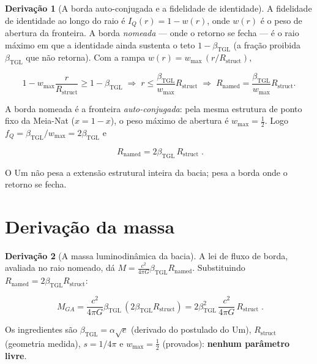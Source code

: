 \documentclass[11pt]{article}
\newcommand{\bTGL}{\beta_{\mathrm{TGL}}}\newcommand{\Msun}{M_{\odot}}\newcommand{\TGL}{\mathrm{TGL}}
\theoremstyle{definition}\newtheorem{deriv}{Derivação}
\begin{document}
\begin{deriv}[A borda auto-conjugada e a fidelidade de identidade]

A fidelidade de identidade ao longo do raio é $I_Q(r)=1-w(r)$, onde $w(r)$ é o peso de abertura da fronteira. A borda \emph{nomeada} --- onde o retorno se fecha --- é o raio máximo em que a identidade ainda sustenta o teto $1-\bTGL$ (a fração proibida $\bTGL$ que não retorna). Com a rampa $w(r)=w_{\max}\,(r/R_{\mathrm{struct}})$,

\begin{equation}1-w_{\max}\frac{r}{R_{\mathrm{struct}}}\geq 1-\bTGL\;\Longrightarrow\;r\leq\frac{\bTGL}{w_{\max}}R_{\mathrm{struct}}\;\Longrightarrow\;R_{\mathrm{named}}=\frac{\bTGL}{w_{\max}}R_{\mathrm{struct}}.\end{equation}

A borda nomeada é a fronteira \emph{auto-conjugada}: pela mesma estrutura de ponto fixo da Meia-Nat ($x=1-x$), o peso máximo de abertura é $w_{\max}=\tfrac12$. Logo $f_Q=\bTGL/w_{\max}=2\bTGL$ e

\begin{equation}\boxed{\;R_{\mathrm{named}}=2\bTGL\,R_{\mathrm{struct}}\;}.\end{equation}

O Um não pesa a extensão estrutural inteira da bacia; pesa a borda onde o retorno se fecha.\end{deriv}

\section{Derivação da massa}

\begin{deriv}[A massa luminodinâmica da bacia]

A lei de fluxo de borda, avaliada no raio nomeado, dá $M=\frac{c^2}{4\pi G}\bTGL R_{\mathrm{named}}$. Substituindo $R_{\mathrm{named}}=2\bTGL R_{\mathrm{struct}}$:

\begin{equation}\boxed{\;M_{GA}=\frac{c^2}{4\pi G}\bTGL\,(2\bTGL R_{\mathrm{struct}})=2\bTGL^2\,\frac{c^2}{4\pi G}\,R_{\mathrm{struct}}\;}.\end{equation}

Os ingredientes são $\bTGL=\alpha\sqrt{e}$ (derivado do postulado do Um), $R_{\mathrm{struct}}$ (geometria medida), $s=1/4\pi$ e $w_{\max}=\tfrac12$ (provados): \textbf{nenhum parâmetro livre}.\end{deriv}
\end{document}
